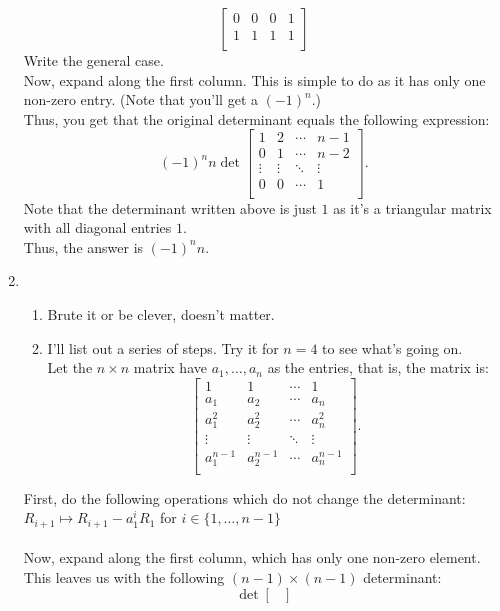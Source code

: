 \documentclass{article}
\begin{document}
\begin{enumerate}
\[\begin{bmatrix}
		0 & 0 & 0 & 1\\
		1 & 1 & 1 & 1\\
	\end{bmatrix}\]
	Write the general case.\\
	Now, expand along the first column. This is simple to do as it has only one non-zero entry. (Note that you'll get a $(-1)^n$.)\\
	Thus, you get that the original determinant equals the following expression:
	\[(-1)^nn\det \begin{bmatrix}
		1 & 2 & \cdots & n-1\\
		0 & 1 & \cdots & n-2\\
		\vdots & \vdots & \ddots & \vdots \\
		0 & 0 & \cdots & 1\\
	\end{bmatrix}.\]
	Note that the determinant written above is just $1$ as it's a triangular matrix with all diagonal entries $1.$\\
	Thus, the answer is $(-1)^nn.$
	\item 
	\begin{enumerate} 
		\item Brute it or be clever, doesn't matter.
		\item I'll list out a series of steps. Try it for $n = 4$ to see what's going on.\\
		Let the $n \times n$ matrix have $a_1, \ldots, a_n$ as the entries, that is, the matrix is:
		\[\begin{bmatrix}
			1 & 1 & \cdots & 1\\
			a_1 & a_2 & \cdots & a_n\\
			a_1^2 & a_2^2 & \cdots & a_n^2\\
			\vdots & \vdots & \ddots & \vdots \\
			a_1^{n-1} & a_2^{n-1} & \cdots & a_n^{n-1}\\
		\end{bmatrix}.\]
	\end{enumerate}
	First, do the following operations which do not change the determinant:\\
	$R_{i+1} \mapsto R_{i+1} -a_1^iR_1$ for $i \in \{1,\ldots,n-1\}$\\~\\
	Now, expand along the first column, which has only one non-zero element.\\
	This leaves us with the following $(n-1)\times(n-1)$ determinant:\\
	\[\det 
		\begin{bmatrix}

\end{bmatrix}\]
\end{enumerate}
\end{document}
